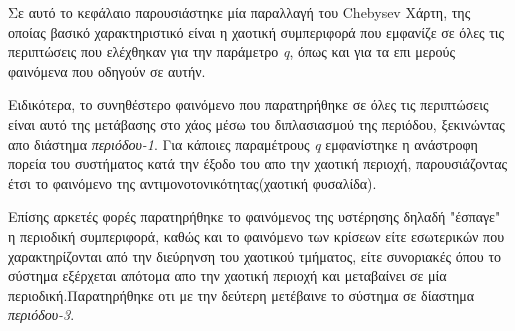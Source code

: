 Σε αυτό το κεφάλαιο παρουσιάστηκε μία παραλλαγή του Chebysev Χάρτη, της οποίας βασικό χαρακτηριστικό είναι η χαοτική συμπεριφορά που εμφανίζε σε όλες τις περιπτώσεις που ελέχθηκαν για την παράμετρο \emph{q}, όπως και για τα επι μερούς φαινόμενα που οδηγούν σε αυτήν.

Ειδικότερα, το συνηθέστερο φαινόμενο που παρατηρήθηκε σε όλες τις περιπτώσεις είναι αυτό της μετάβασης στο χάος μέσω του διπλασιασμού της περιόδου, ξεκινώντας απο διάστημα \emph{περιόδου-1}.
Για κάποιες παραμέτρους  \emph{q} εμφανίστηκε η ανάστροφη πορεία του συστήματος κατά την έξοδο του απο την χαοτική περιοχή, παρουσιάζοντας έτσι το φαινόμενο της αντιμονοτονικότητας(χαοτική φυσαλίδα).

Επίσης αρκετές φορές παρατηρήθηκε το φαινόμενος της υστέρησης δηλαδή "έσπαγε" η περιοδική συμπεριφορά, καθώς και το φαινόμενο των κρίσεων είτε εσωτερικών που χαρακτηρίζονται από την διεύρηνση του χαοτικού τμήματος, είτε συνοριακές όπου το σύστημα εξέρχεται απότομα απο την χαοτική περιοχή και μεταβαίνει σε μία περιοδική.Παρατηρήθηκε οτι με  την δεύτερη μετέβαινε το σύστημα σε δίαστημα \emph{περιόδου-3}.